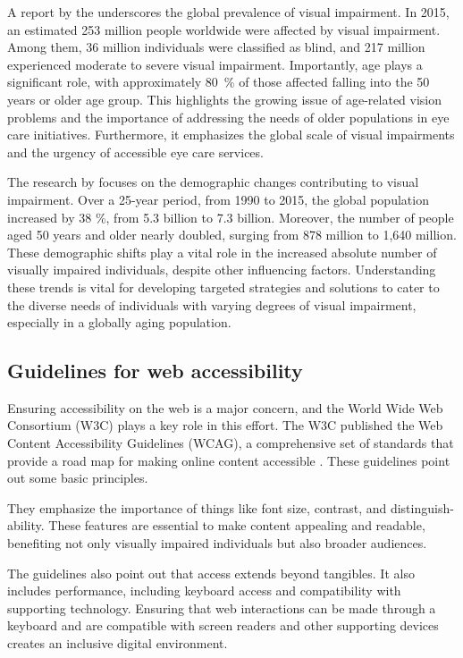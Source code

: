 \documentclass[agile, final]{copernicus-agile}
\begin{document}
A report by the \cite{WHO2023} underscores the global prevalence of visual impairment. In 2015, an estimated 253 million people worldwide were affected by visual impairment. Among them, 36 million individuals were classified as blind, and 217 million experienced moderate to severe visual impairment. Importantly, age plays a significant role, with approximately 80~\% of those affected falling into the 50 years or older age group. This highlights the growing issue of age-related vision problems and the importance of addressing the needs of older populations in eye care initiatives. Furthermore, it emphasizes the global scale of visual impairments and the urgency of accessible eye care services.

The research by \cite{AcklandEA2017} focuses on the demographic changes contributing to visual impairment. Over a 25-year period, from 1990 to 2015, the global population increased by 38 \%, from 5.3 billion to 7.3 billion. Moreover, the number of people aged 50 years and older nearly doubled, surging from 878 million to 1,640 million. These demographic shifts play a vital role in the increased absolute number of visually impaired individuals, despite other influencing factors. Understanding these trends is vital for developing targeted strategies and solutions to cater to the diverse needs of individuals with varying degrees of visual impairment, especially in a globally aging population.

\subsection{Guidelines for web accessibility}

Ensuring accessibility on the web is a major concern, and the World Wide Web Consortium (W3C) plays a key role in this effort. The W3C published the Web Content Accessibility Guidelines (WCAG), a comprehensive set of standards that provide a road map for making online content accessible \citep{W3C2023}. These guidelines point out some basic principles.

They emphasize the importance of things like font size, contrast, and distinguish-ability. These features are essential to make content appealing and readable, benefiting not only visually impaired individuals but also broader audiences.

The guidelines also point out that access extends beyond tangibles. It also includes performance, including keyboard access and compatibility with supporting technology. Ensuring that web interactions can be made through a keyboard and are compatible with screen readers and other supporting devices creates an inclusive digital environment.
\end{document}
